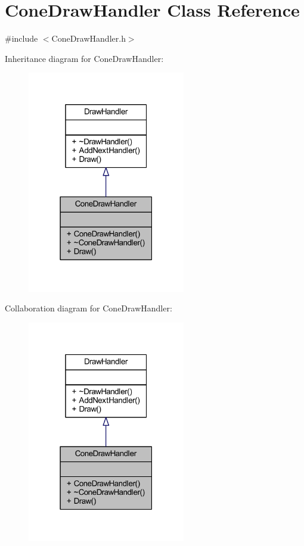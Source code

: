 \hypertarget{class_cone_draw_handler}{}\section{Cone\+Draw\+Handler Class Reference}
\label{class_cone_draw_handler}


{\ttfamily \#include $<$Cone\+Draw\+Handler.\+h$>$}



Inheritance diagram for Cone\+Draw\+Handler\+:
\nopagebreak
\begin{figure}[H]
\begin{center}
\leavevmode
\includegraphics[width=195pt]{class_cone_draw_handler__inherit__graph}
\end{center}
\end{figure}


Collaboration diagram for Cone\+Draw\+Handler\+:
\nopagebreak
\begin{figure}[H]
\begin{center}
\leavevmode
\includegraphics[width=195pt]{class_cone_draw_handler__coll__graph}
\end{center}
\end{figure}
